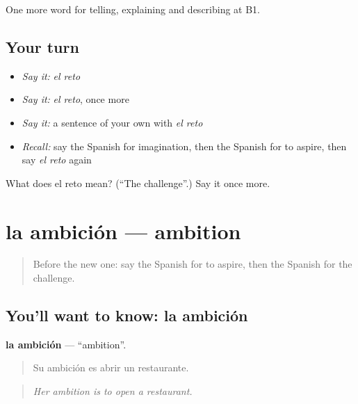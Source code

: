 \begin{grammarlens}[title={What you've built}]
One more word for telling, explaining and describing at B1.
\end{grammarlens}

\subsection*{Your turn}
\begin{itemize}
\raggedright
  \item \emph{Say it:} \emph{el reto}
  \item \emph{Say it:} \emph{el reto}, once more
  \item \emph{Say it:} a sentence of your own with \emph{el reto}
  \item \emph{Recall:} say the Spanish for imagination, then the Spanish for to aspire, then say \emph{el reto} again
\end{itemize}

\begin{tcolorbox}[breakable,colback=teal!4,colframe=teal!35!black,title={Before you move on}]
What does el reto mean? (\textquotedblleft{}The challenge\textquotedblright{}.) Say it once more.
\end{tcolorbox}
\section[la ambición]{la ambición — ambition}

\label{lesson:ES-C766-ambicion}



\begin{quote}
Before the new one: say the Spanish for to aspire, then the Spanish for the challenge.
\end{quote}

\subsection*{You'll want to know: la ambición}
\textbf{la ambición} — \textquotedblleft{}ambition\textquotedblright{}.

\begin{quote}
Su ambición es abrir un restaurante.
\end{quote}

\begin{quote}
\emph{Her ambition is to open a restaurant.}
\end{quote}

